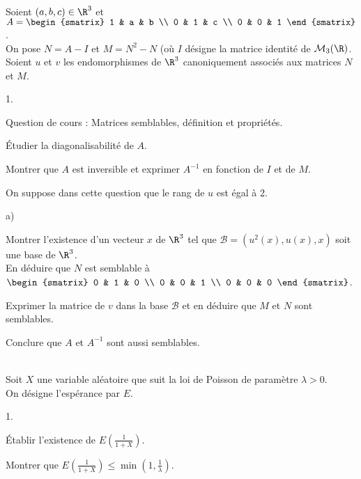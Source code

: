 \documentclass[11pt]{article}%
\begin{document}
\newpage


\begin{exerciceAP}~\\
  Soient $(a,b,c) \in \R^3$ et $A = 
  \begin{smatrix} 
    1 & a & b \\ 
    0 & 1 & c \\ 
    0 & 0 & 1 
  \end{smatrix}$.\\
  On pose $N = A- I$ et $M = N^2 - N$ (où $I$ désigne la matrice
  identité de $\mathcal{M}_3(\R)$.
  \\[.2cm]
  Soient $u$ et $v$ les endomorphismes de $\R^3$ canoniquement
  associés aux matrices $N$ et $M$.
  \begin{noliste}{1.}
    \setlength{\itemsep}{2mm}
  \item Question de cours : Matrices semblables, définition et propriétés.
  \item Étudier la diagonalisabilité de $A$.
  \item Montrer que $A$ est inversible et exprimer $A^{-1}$ en
    fonction de $I$ et de $M$.
  \item On suppose dans cette question que le rang de $u$ est égal à 2. 
    \begin{noliste}{a)}
    \setlength{\itemsep}{2mm}
    \item Montrer l'existence d'un vecteur $x$ de $\R^3$ tel que
      $\mathcal{B} = (u^2(x),u(x),x)$ soit une base de $\R^3$.
      \\[.2cm]
      En déduire que $N$ est semblable à $
      \begin{smatrix}
        0 & 1 & 0 \\ 
        0 & 0 & 1 \\ 
        0 & 0 & 0 
      \end{smatrix}$.
    \item Exprimer la matrice de $v$ dans la base $\mathcal{B}$ et en
      déduire que $M$ et $N$ sont semblables.
    \item Conclure que $A$ et $A^{-1}$ sont aussi semblables.
    \end{noliste}
  \end{noliste}
\end{exerciceAP}


\begin{exerciceSP}~\\
  Soit $X$ une variable aléatoire que suit la loi de Poisson de
  paramètre $\lambda > 0$. \\
  On désigne l'espérance par $E$.
  \begin{noliste}{1.}
    \setlength{\itemsep}{2mm}
  \item Établir l'existence de $E \left( \frac{1}{1+X} \right)$.
  \item Montrer que $E \left( \frac{1}{1+X} \right) \leq \min \left( 1
      , \frac{1}{\lambda} \right)$.
  \end{noliste}
\end{exerciceSP}
\end{document}
